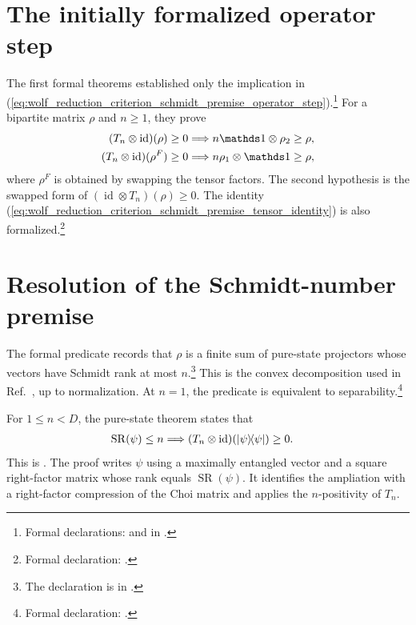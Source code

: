 \documentclass{article}
\begin{document}
\section{The initially formalized operator step}

The first formal theorems established only the implication in
(\ref{eq:wolf_reduction_criterion_schmidt_premise_operator_step}).\footnote{Formal
declarations:
     and
     in
    .}
For a bipartite matrix $\rho$ and $n\geq1$, they prove
\begin{align}
    (T_n\otimes\operatorname{id})(\rho)\geq0
        &\Longrightarrow
        n\Id\otimes\rho_2\geq\rho,
    \label{eq:wolf_reduction_criterion_schmidt_premise_formal_left}\\
    (T_n\otimes\operatorname{id})(\rho^F)\geq0
        &\Longrightarrow
        n\rho_1\otimes\Id\geq\rho,
    \label{eq:wolf_reduction_criterion_schmidt_premise_formal_right}
\end{align}
where $\rho^F$ is obtained by swapping the tensor factors. The second
hypothesis is the swapped form of
$(\operatorname{id}\otimes T_n)(\rho)\geq0$. The identity
(\ref{eq:wolf_reduction_criterion_schmidt_premise_tensor_identity}) is also
formalized.\footnote{Formal declaration:
    .}

\section{Resolution of the Schmidt-number premise}

The formal predicate
 records that $\rho$ is a finite sum of
pure-state projectors whose vectors have Schmidt rank at most $n$.\footnote{The
declaration is in .}
This is the convex decomposition used in Ref.~\cite{Wolf2012Quantum}, up to
normalization. At $n=1$, the predicate is equivalent to
separability.\footnote{Formal declaration:
    .}

For $1\leq n<D$, the pure-state theorem states that
\begin{align}
    \operatorname{SR}(\psi)\leq n
        &\Longrightarrow
        (T_n\otimes\operatorname{id})
        \!\left(|\psi\rangle\!\langle \psi|\right)\geq0.
    \label{eq:wolf_reduction_criterion_schmidt_premise_pure_state_step}
\end{align}
This is
. The proof
writes $\psi$ using a maximally entangled vector and a square right-factor
matrix whose rank equals $\operatorname{SR}(\psi)$. It identifies the
ampliation with a right-factor compression of the Choi matrix and applies the
$n$-positivity of $T_n$.
\end{document}
